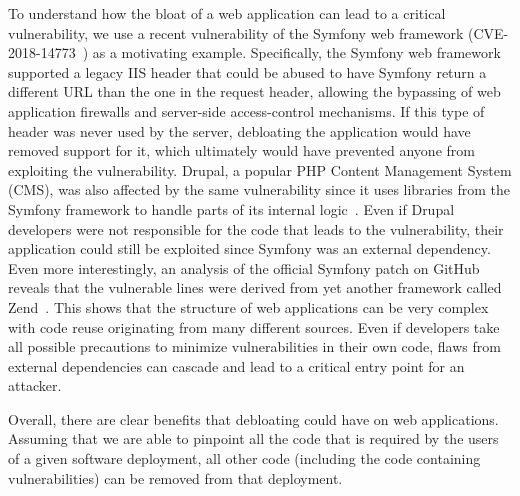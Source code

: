To understand how the bloat of a web application can lead to a critical
vulnerability, we use a recent vulnerability of the Symfony web
framework (CVE-2018-14773~\cite{symfonyVulnerability}) as a motivating
example. Specifically, the Symfony web framework supported a legacy IIS
header that could be abused to have Symfony return a different URL than the
one in the request header, allowing the bypassing of web application firewalls
and server-side access-control mechanisms. If this type of header
was never used by the server, debloating the application would have removed
support for it, which ultimately would have prevented anyone from exploiting
the vulnerability. Drupal, a popular PHP Content Management System (CMS), was also affected by
the same vulnerability since it uses libraries from the Symfony framework
to handle parts of its internal logic~\cite{drupalVulenrability}. Even
if Drupal developers were not responsible for the code that leads to the
vulnerability, their application could still be exploited since Symfony
was an external dependency. Even more interestingly, an analysis of the
official Symfony patch on GitHub~\cite{symfonyPatch}
reveals that the vulnerable lines were derived from yet another framework
called Zend~\cite{zendVulnerability}. This shows that the structure of web
applications can be very complex with code reuse originating from many
different sources. Even if developers take all possible precautions to
minimize vulnerabilities in their own code, flaws from external dependencies
can cascade and lead to a critical entry point for an attacker.

Overall, there are clear benefits that debloating could have on web
applications. Assuming that we are able to pinpoint all the code that is required
by the users of a given software deployment, all other code (including the
code containing vulnerabilities) can be removed from that deployment.
